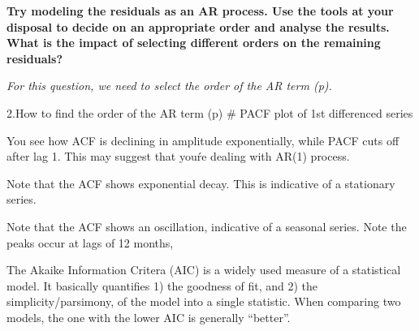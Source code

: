 \item \textbf{Try modeling the residuals as an AR process. Use the tools at your disposal to decide on an appropriate order and analyse the results. What is the impact of selecting different orders on the remaining residuals?}

\textit{For this question, we need to select the order of the \gls{AR} term (p). }


2.How to find the order of the AR term (p)
\# PACF plot of 1st differenced series


You see how ACF is declining in amplitude exponentially, while PACF cuts off after lag 1. This may suggest that you\'re dealing with AR(1) process.

Note that the ACF shows exponential decay. This is indicative of a stationary series.

Note that the ACF shows an oscillation, indicative of a seasonal series. Note the peaks occur at lags of 12 months, 

The Akaike Information Critera (AIC) is a widely used measure of a statistical model. It basically quantifies 1) the goodness of fit, and 2) the simplicity/parsimony, of the model into a single statistic. When comparing two models, the one with the lower AIC is generally “better”.